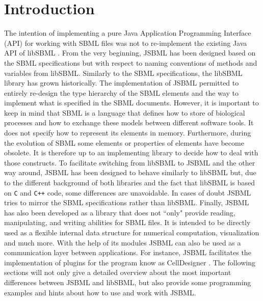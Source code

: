 \section{Introduction}

The intention of implementing a pure Java\texttrademark{}
Application Programming Interface (API) for working with SBML files was not to
re-implement the existing Java API of libSBML
%
\citep{Bornstein2008}.
From the very beginning, JSBML
%
has been designed based on the SBML specifications \citep{Hucka2003, Hucka2008,
Hucka2010a} but with respect to naming conventions of methods and variables from
libSBML. Similarly to the SBML specifications,
%
the libSBML library has grown historically. The implementation of JSBML
permitted to entirely re-design the type hierarchy of the SBML elements and the
way to implement what is specified in the SBML documents. However, it is
important to keep in mind that SBML is a language that defines how to store of
biological processes and how to exchange these models between
%
different software tools. It
does not specify how to represent its elements in memory. Furthermore, during
the evolution of SBML some elements or properties of elements have become
obsolete.
%
It is therefore up to an implementing library to
decide how to deal with those constructs. To facilitate switching from libSBML
to JSBML and the other way around, JSBML has been designed to behave similarly
to libSBML but, due to the different background of both libraries and the fact
that libSBML is based on \texttt{C}
%
and \texttt{C++}
%
code, some differences are unavoidable. In cases of doubt JSBML tries to mirror
the SBML specifications rather than libSBML. Finally, JSBML has also been
developed as a library that does not ``only" provide reading, manipulating, and
writing abilities for SBML files. It is intended to be directly used as a
flexible internal data structure for numerical computation, visualization and
much more. With the help of its modules JSBML can also be used as a
communication layer between applications. For instance, JSBML facilitates the
implementation of plugins for the program know as CellDesigner
\citep{Funahashi2003}. The following sections will not only give a detailed
overview about the most important differences between JSBML and libSBML, but
also provide some programming examples and hints about how to use and work with
JSBML.



